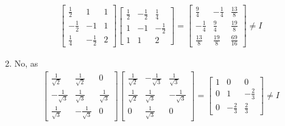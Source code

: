 \begin{Answer}
\begin{enumerate}[label=(\alph*)]
\begin{align*}
\begin{bmatrix}
\frac{1}{2}&1&1\\ 
-\frac{1}{2}&-1&1\\ 
\frac{1}{4}&-\frac{1}{2}&2
\end{bmatrix}
\begin{bmatrix}
\frac{1}{2}&-\frac{1}{2}&\frac{1}{4}\\
1&-1&-\frac{1}{2}\\ 
1&1&2
\end{bmatrix}
=
\begin{bmatrix}
\frac{9}{4}&-\frac{1}{4}&\frac{13}{8}\\ 
-\frac{1}{4}&\frac{9}{4}&\frac{19}{8}\\ 
\frac{13}{8}&\frac{19}{8}&\frac{69}{16}
\end{bmatrix}
\neq I
\end{align*}
\item No, as
\begin{align*}
\begin{bmatrix}
\frac{1}{\sqrt{2}}&\frac{1}{\sqrt{2}}&0\\ 
-\frac{1}{\sqrt{3}}&\frac{1}{\sqrt{3}}&\frac{1}{\sqrt{3}}\\ 
\frac{1}{\sqrt{3}}&-\frac{1}{\sqrt{3}}&0
\end{bmatrix}
\begin{bmatrix}
\frac{1}{\sqrt{2}} & -\frac{1}{\sqrt{3}} & \frac{1}{\sqrt{3}}\\
\frac{1}{\sqrt{2}} & \frac{1}{\sqrt{3}} & -\frac{1}{\sqrt{3}}\\
0 & \frac{1}{\sqrt{3}} & 0
\end{bmatrix}
=
\begin{bmatrix}
1&0&0\\ 
0&1&-\frac{2}{3}\\ 
0&-\frac{2}{3}&\frac{2}{3}
\end{bmatrix} \neq I
\end{align*}
\end{enumerate}
\end{Answer}


